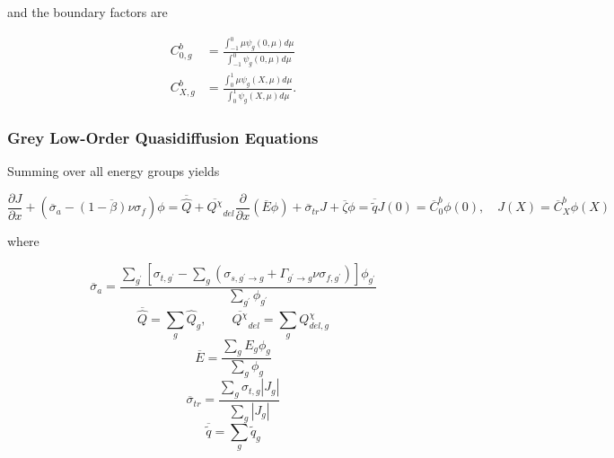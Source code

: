 \documentclass{proposal}
\newcommand{\ddx}{\ensuremath{\frac{\partial}{\partial x}}}
\newcommand{\p}{\ensuremath{^\prime}}
\newcommand{\rarr}{\ensuremath{\rightarrow}}
\begin{document}
and the boundary factors are

\begin{align}
    C_{0, g}^b &= \frac{\int_{-1}^{0} \mu \psi_g(0, \mu)d\mu}{\int_{-1}^{0} \psi_g(0, \mu)d\mu}\\
    C_{X, g}^b &= \frac{\int_{0}^{1} \mu \psi_g(X, \mu)d\mu}{\int_{0}^{1} \psi_g(X, \mu)d\mu}.
\end{align}


\subsubsection{Grey Low-Order Quasidiffusion Equations}

Summing  over all energy groups yields

\begin{subequations}
    \begin{equation}
        \frac{\partial J}{\partial x} + \left(\overline{\sigma}_a - \overline{(1-\beta)\nu\sigma_f} \right)\phi = \overline{\hat{Q}} + \overline{Q^\chi}_{del}
    \end{equation}
    \begin{equation}
        \ddx \left(\overline{E}\phi \right) + \overline{\sigma}_{tr}J + \overline{\zeta}\phi = \overline{\tilde{q}}
    \end{equation}
    \begin{equation}
        J(0) = \overline{C}^b_0\phi(0)    , \quad J(X) = \overline{C}^b_X\phi(X)
    \end{equation}
\end{subequations}

where 

\begin{equation}
    \overline{\sigma}_a = \frac{\sum_{g\p} \left[ \sigma_{t, g\p} - \sum_{g}\left(\sigma_{s, g\p\rarr g} + \Gamma_{g\p \rarr g}\nu\sigma_{f, g\p} \right)\right] \phi_{g\p}}{\sum_{g\p}{\phi_{g\p}}}
\end{equation}
\begin{equation}
    \overline{\hat{Q}} = {\sum_g \hat{Q}_g}, \qquad \overline{Q^\chi}_{del} = {\sum_g Q^\chi_{del, g}}
\end{equation}
\begin{equation}
    \overline{E} = \frac{\sum_g E_g \phi_g}{\sum_g \phi_g}
\end{equation}
\begin{equation}
    \overline{\sigma}_{tr} = \frac{\sum_{g}\sigma_{t, g}|J_g|}{\sum_g |J_g|}
\end{equation}
\begin{equation}
    \overline{\tilde{q}} = \sum_g \tilde{q}_g
\end{equation}
\end{document}
